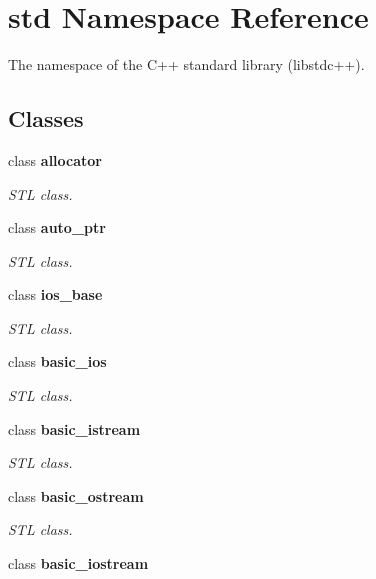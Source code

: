 \hypertarget{namespacestd}{
\section{std Namespace Reference}
\label{namespacestd}
}


The namespace of the C++ standard library (libstdc++).  


\subsection*{Classes}
\begin{DoxyCompactItemize}
\item 
class {\bfseries allocator}
\begin{DoxyCompactList}\small\item\em STL class. \item\end{DoxyCompactList}\item 
class {\bfseries auto\_\-ptr}
\begin{DoxyCompactList}\small\item\em STL class. \item\end{DoxyCompactList}\item 
class {\bfseries ios\_\-base}
\begin{DoxyCompactList}\small\item\em STL class. \item\end{DoxyCompactList}\item 
class {\bfseries basic\_\-ios}
\begin{DoxyCompactList}\small\item\em STL class. \item\end{DoxyCompactList}\item 
class {\bfseries basic\_\-istream}
\begin{DoxyCompactList}\small\item\em STL class. \item\end{DoxyCompactList}\item 
class {\bfseries basic\_\-ostream}
\begin{DoxyCompactList}\small\item\em STL class. \item\end{DoxyCompactList}\item 
class {\bfseries basic\_\-iostream}

\end{DoxyCompactItemize}
